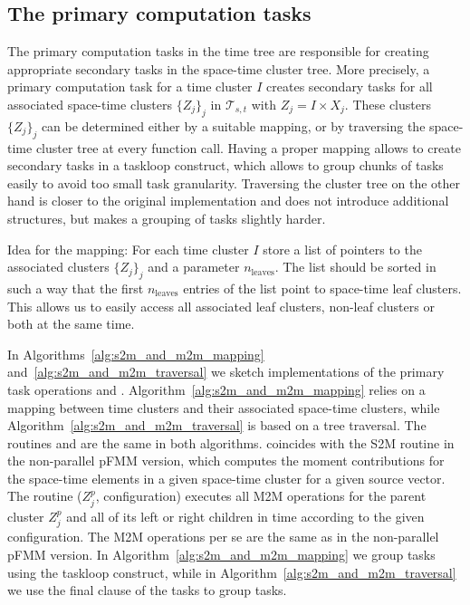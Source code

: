 \documentclass[a4paper,11pt]{article}
\theoremstyle{plain}
\theoremstyle{definition}
\theoremstyle{remark}
\begin{document}
\subsection{The primary computation tasks} \label{sec:secondary_tasks}

The primary computation tasks in the time tree are responsible for creating appropriate secondary tasks in the space-time cluster tree. More precisely, a primary computation task for a time cluster $I$ creates secondary tasks for all associated space-time clusters $\{Z_j\}_j$ in $\mathcal{T}_{s,t}$ with $Z_j = I \times X_j$. These clusters $\{Z_j\}_j$ can be determined either by a suitable mapping, or by traversing the space-time cluster tree at every function call. Having a proper mapping allows to create secondary tasks in a taskloop construct, which allows to group chunks of tasks easily to avoid too small task granularity. Traversing the cluster tree on the other hand is closer to the original implementation and does not introduce additional structures, but makes a grouping of tasks slightly harder.

Idea for the mapping: For each time cluster $I$ store a list of pointers to the associated clusters $\{Z_j\}_j$ and a parameter $n_{\text{leaves}}$. The list should be sorted in such a way that the first $n_{\text{leaves}}$ entries of the list point to space-time leaf clusters. This allows us to easily access all associated leaf clusters, non-leaf clusters or both at the same time. 

In Algorithms~\ref{alg:s2m_and_m2m_mapping} and~\ref{alg:s2m_and_m2m_traversal} we sketch implementations of the primary task operations  and . Algorithm~\ref{alg:s2m_and_m2m_mapping} relies on a mapping between time clusters and their associated space-time clusters, while Algorithm~\ref{alg:s2m_and_m2m_traversal} is based on a tree traversal. The routines  and  are the same in both algorithms.  coincides with the S2M routine in the non-parallel pFMM version, which computes the moment contributions for the space-time elements in a given space-time cluster for a given source vector. The routine ($Z_j^p$, configuration) executes all M2M operations for the parent cluster $Z_j^p$ and all of its left or right children in time according to the given configuration. The M2M operations per se are the same as in the non-parallel pFMM version. In Algorithm~\ref{alg:s2m_and_m2m_mapping} we group tasks using the taskloop construct, while in Algorithm~\ref{alg:s2m_and_m2m_traversal} we use the final clause of the tasks to group tasks.
\end{document}
